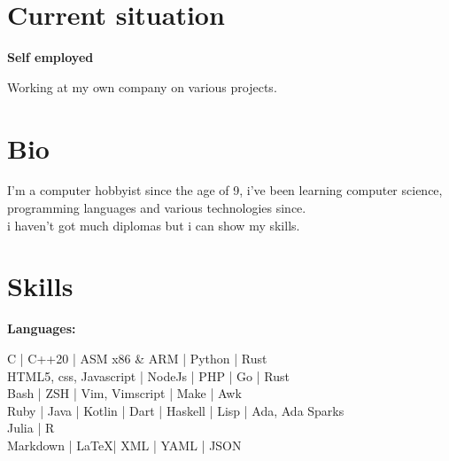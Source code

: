 \documentclass[a4paper,10pt]{article}
\begin{document}
\begin{adjustbox}{valign=t}
\begin{minipage}{0.6\textwidth} %
\section*{Current situation}
\begin{description}
\raggedright
\item[\normalfont \textcolor{ColorOne}{Sept. 2021 -- Now.}] \textbf{Self employed}\\ \medskip

Working at my own company on various projects.

\vspace{-0.9\baselineskip}
\end{description}

\section*{Bio}
\begin{spacing}{1.0}

\vspace{-0.6\baselineskip}

\hspace{5mm} I'm a computer hobbyist since the age of 9, i've been learning computer science,
programming languages and various technologies since.\\
i haven't got much diplomas but i can show my skills.
\end{spacing}
\vspace{-0.8\baselineskip}
\section*{Skills}
\begin{description}
\begin{spacing}{1.0}
\item{\textbf{Languages:}}

    C | C++20 | ASM x86 \& ARM | Python | Rust \\
    HTML5, css, Javascript | NodeJs | PHP | Go | Rust\\
    Bash | ZSH | Vim, Vimscript | Make | Awk\\
    Ruby | Java | Kotlin | Dart | Haskell | Lisp | Ada, Ada Sparks\\
    Julia | R \\
    Markdown | \LaTeX | XML | YAML | JSON


\end{spacing}
\end{description}
\end{minipage}
\end{adjustbox}
\end{document}
